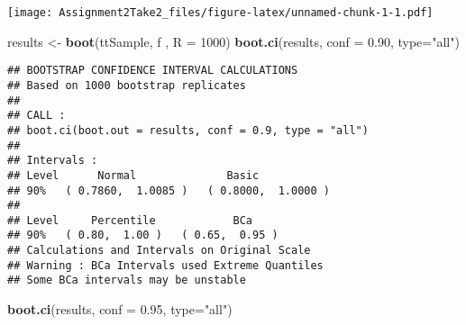 \documentclass[]{article}
\newenvironment{Shaded}{\begin{snugshade}}{\end{snugshade}}
\newcommand{\KeywordTok}[1]{\textcolor[rgb]{0.13,0.29,0.53}{\textbf{#1}}}
\newcommand{\DataTypeTok}[1]{\textcolor[rgb]{0.13,0.29,0.53}{#1}}
\newcommand{\DecValTok}[1]{\textcolor[rgb]{0.00,0.00,0.81}{#1}}
\newcommand{\FloatTok}[1]{\textcolor[rgb]{0.00,0.00,0.81}{#1}}
\newcommand{\StringTok}[1]{\textcolor[rgb]{0.31,0.60,0.02}{#1}}
\newcommand{\CommentTok}[1]{\textcolor[rgb]{0.56,0.35,0.01}{\textit{#1}}}
\newcommand{\OperatorTok}[1]{\textcolor[rgb]{0.81,0.36,0.00}{\textbf{#1}}}
\newcommand{\NormalTok}[1]{#1}
\begin{document}
\begin{Shaded}
\end{Shaded}

\texttt{[image: Assignment2Take2\_files/figure-latex/unnamed-chunk-1-1.pdf]}

\begin{Shaded}
\begin{Highlighting}[]
\NormalTok{results <-}\StringTok{ }\KeywordTok{boot}\NormalTok{(ttSample, f , }\DataTypeTok{R =} \DecValTok{1000}\NormalTok{)}
\KeywordTok{boot.ci}\NormalTok{(results, }\DataTypeTok{conf =} \FloatTok{0.90}\NormalTok{, }\DataTypeTok{type=}\StringTok{"all"}\NormalTok{)}
\end{Highlighting}
\end{Shaded}

\begin{verbatim}
## BOOTSTRAP CONFIDENCE INTERVAL CALCULATIONS
## Based on 1000 bootstrap replicates
## 
## CALL : 
## boot.ci(boot.out = results, conf = 0.9, type = "all")
## 
## Intervals : 
## Level      Normal              Basic         
## 90%   ( 0.7860,  1.0085 )   ( 0.8000,  1.0000 )  
## 
## Level     Percentile            BCa          
## 90%   ( 0.80,  1.00 )   ( 0.65,  0.95 )  
## Calculations and Intervals on Original Scale
## Warning : BCa Intervals used Extreme Quantiles
## Some BCa intervals may be unstable
\end{verbatim}

\begin{Shaded}
\begin{Highlighting}[]
\KeywordTok{boot.ci}\NormalTok{(results, }\DataTypeTok{conf =} \FloatTok{0.95}\NormalTok{, }\DataTypeTok{type=}\StringTok{"all"}\NormalTok{)}
\end{Highlighting}
\end{Shaded}
\end{document}

